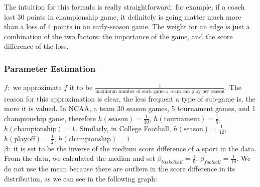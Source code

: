 \documentclass[titlepage,12pt]{article}
\begin{document}
\noindent The intuition for this formula is really straightforward: for example, if a coach lost 30 points in championship game, it definitely is going matter much more than a loss of 4 points in an early-season game. The weight for an edge is just a combination of the two factors: the importance of the game, and the score difference of the loss.

\subsubsection*{Parameter Estimation}
\noindent $f:$ we approximate $f$ it to be $\frac{1}{\mbox{maximum number of such game a team can play per season}}$. The reason for this approximation is clear, the less frequent a type of sub-game is, the more it is valued. In NCAA, a team 30 season games, 5 tournament games, and 1 championship game, therefore $h(\mbox{season}) = \frac{1}{30}$, $h(\mbox{tournament}) = \frac{1}{5}$, $h(\mbox{championship}) = 1$. Similarly, in College Football, $h(\mbox{season}) = \frac{1}{12}$, $h(\mbox{playoff}) = \frac{1}{2}$, $h(\mbox{championship}) = 1$
\\

\noindent $\beta:$ it is set to be the inverse of the medium score difference of a sport in the data. From the data, we calculated the median and set $\beta_{basketball} = \frac{1}{9}$, $\beta_{football} = \frac{1}{10}$. We do not use the mean because there are outliers in the score difference in its distribution, as we can see in the following graph:
\\
\end{document}
